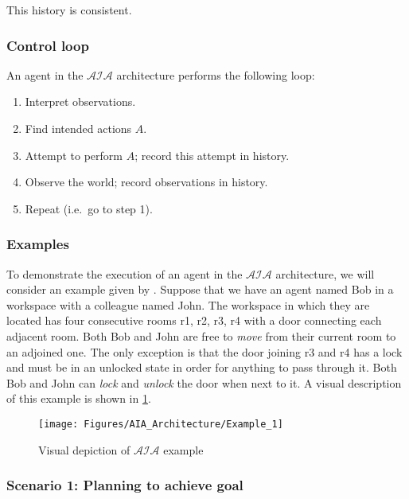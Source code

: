 This history is consistent.

\subsubsection{Control loop}
\label{subsubsec:control_loop}

An agent in the $\mathcal{AIA}$ architecture performs the following loop:

\begin{enumerate}
    \item Interpret observations.
    \item Find intended actions $A$.
    \item Attempt to perform $A$;
        record this attempt in history.
    \item Observe the world;
        record observations in history.
    \item Repeat (i.e.~go to step 1).
\end{enumerate}

\subsubsection{Examples}
\label{subsubsec:aia_examples}

To demonstrate the execution of an agent in the $\mathcal{AIA}$ architecture, we will consider an example given by \citet{blount_architecture_2013}.
Suppose that we have an agent named Bob in a workspace with a colleague named John.
The workspace in which they are located has four consecutive rooms r1, r2, r3, r4 with a door connecting each adjacent room.
Both Bob and John are free to \textit{move} from their current room to an adjoined one.
The only exception is that the door joining r3 and r4 has a lock and must be in an unlocked state in order for anything to pass through it.
Both Bob and John can \textit{lock} and \textit{unlock} the door when next to it.
A visual description of this example is shown in \cref{fig:aia_example}.

\begin{figure}[h]
    \centering
    \texttt{[image: Figures/AIA\_Architecture/Example\_1]}
    \caption{Visual depiction of $\mathcal{AIA}$ example}
    \label{fig:aia_example}
\end{figure}

\subsubsection{Scenario 1: Planning to achieve goal~\citep{blount_towards_2014}}
\label{subsubsec:aia_scenario_1}

